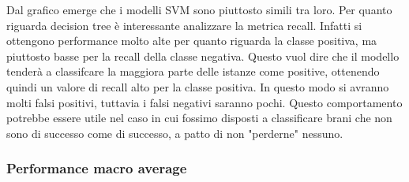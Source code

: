 Dal grafico emerge che i modelli SVM sono piuttosto simili tra loro. Per quanto riguarda decision tree è interessante analizzare la metrica recall. Infatti si ottengono performance molto alte per quanto riguarda la classe positiva, ma piuttosto basse per la recall della classe negativa. Questo vuol dire che il modello tenderà a classifcare la maggiora parte delle istanze come positive, ottenendo quindi un valore di recall alto per la classe positiva. In questo modo si avranno molti falsi positivi, tuttavia i falsi negativi saranno pochi. Questo comportamento potrebbe essere utile nel caso in cui fossimo disposti a classificare brani che non sono di successo come di successo, a patto di non "perderne" nessuno.

\subsubsection{Performance macro average}
